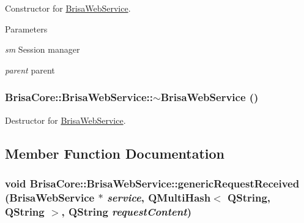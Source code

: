 Constructor for \hyperlink{classBrisaCore_1_1BrisaWebService}{BrisaWebService}. 
\begin{DoxyParams}{Parameters}
\item[{\em sm}]Session manager \item[{\em parent}]parent \end{DoxyParams}
\hypertarget{classBrisaCore_1_1BrisaWebService_a15cfdd76811cd0324163398d1220c693}{
\subsubsection[{$\sim$BrisaWebService}]{\setlength{\rightskip}{0pt plus 5cm}BrisaCore::BrisaWebService::$\sim$BrisaWebService ()}}
\label{classBrisaCore_1_1BrisaWebService_a15cfdd76811cd0324163398d1220c693}


Destructor for \hyperlink{classBrisaCore_1_1BrisaWebService}{BrisaWebService}. 

\subsection{Member Function Documentation}
\hypertarget{classBrisaCore_1_1BrisaWebService_a64f1eecefc1c36442dfa1fc63e4e4222}{
\subsubsection[{genericRequestReceived}]{\setlength{\rightskip}{0pt plus 5cm}void BrisaCore::BrisaWebService::genericRequestReceived ({\bf BrisaWebService} $\ast$ {\em service}, \/  QMultiHash$<$ QString, QString $>$, \/  QString {\em requestContent})}}
\label{classBrisaCore_1_1BrisaWebService_a64f1eecefc1c36442dfa1fc63e4e4222}


